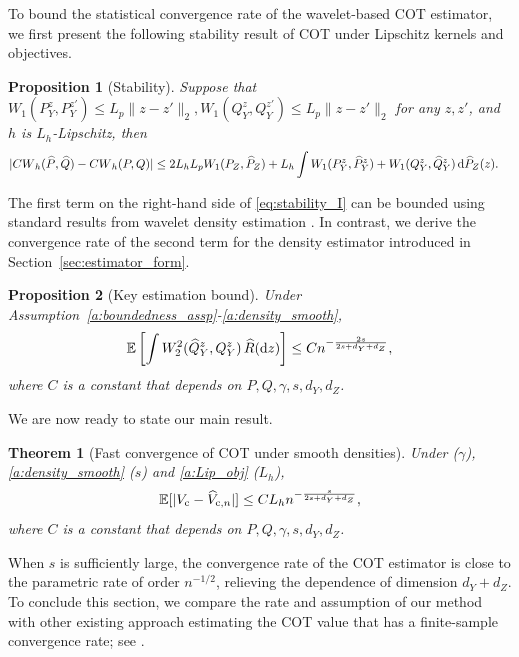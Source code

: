 \documentclass{article}
\theoremstyle{plain}
\newtheorem{theorem}{Theorem}[section]
\newtheorem{proposition}{Proposition}[section]
\theoremstyle{definition}
\def\EE{\mathbb{E}}
\def\PP{P}
\def\QQ{Q}
\newcommand{\cc}{\textup{c}}
\theoremstyle{plain}
\newcommand{\diff}{{\rm d}}
\def\EE{\mathbb{E}}
\newcommand{\Cwass}{{CW}}
\begin{document}
To bound the statistical convergence rate of the wavelet-based COT estimator, we first present the following stability result of COT under Lipschitz kernels and objectives.
\begin{proposition}[Stability]\label{prop:stability_I}
    Suppose that $W_1(\PP_Y^z, \PP_Y^{z'}) \leq L_p \|z - z'\|_2, W_1(\QQ_Y^z, \QQ_Y^{z'}) \leq L_p \|z - z'\|_2$ for any $z, z'$, and $h$ is $L_h$-Lipschitz, then
    \begin{align}\label{eq:stability_I}
    \begin{split}
        &|\Cwass_h(\widehat \PP, \widehat \QQ) - \Cwass_h(\PP, \QQ)| \leq 2L_h L_p W_1(\PP_Z, \widehat \PP_Z) + L_h \int W_1(\PP_Y^z, \widehat \PP_Y^z) + W_1(\QQ_Y^z, \widehat \QQ_Y^z) \,\diff  \widehat \PP_Z (z). 
        \end{split}
    \end{align}
\end{proposition}
The first term on the right-hand side of \eqref{eq:stability_I} can be bounded using standard results from wavelet density estimation \parencite{niles2022minimax}. In contrast, we derive the convergence rate of the second term for the density estimator introduced in Section~\ref{sec:estimator_form}. 
\begin{proposition}[Key estimation bound]\label{prop:core_rate_main}
Under Assumption~\ref{a:boundedness_assp}-\ref{a:density_smooth},
    \[
        \EE\left[\int W^2_2(\widehat \QQ_Y^z, \QQ_Y^z) \, \widehat R(\diff z)\right] \leq C n^{-\frac{2s}{2s+d_Y+d_Z}},
    \]
    where $C$ is a constant that depends on $P, Q, \gamma, s, d_Y, d_Z$.
\end{proposition}

We are now ready to state our main result.
\begin{theorem}[Fast convergence of COT under smooth densities]\label{thm:main_thm1}
    Under  ($\gamma$), \ref{a:density_smooth} ($s$) and \ref{a:Lip_obj} ($L_h$), 
    \[
        \EE[|V_{\cc} - \widehat V_{\cc, n}|] \leq C L_h n^{-\frac{s}{2s+d_Y + d_Z}},      
    \]
    where $C$ is a constant that depends on $P, Q, \gamma, s, d_Y, d_Z$.
\end{theorem}
When $s$ is sufficiently large, the convergence rate of the COT estimator is close to the parametric rate of order $n^{-1/2}$, relieving the dependence of dimension $d_Y + d_Z$. 
To conclude this section, we compare the rate and assumption of our method with other existing approach estimating the COT value that has a finite-sample convergence rate; see .
\end{document}
